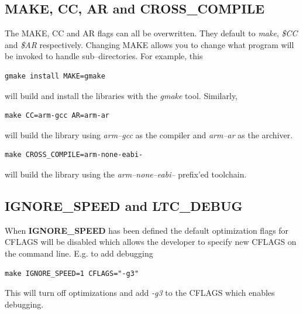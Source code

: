 \documentclass[synpaper]{book}
\begin{document}
\subsection{MAKE, CC, AR and CROSS\_COMPILE}
   
The MAKE, CC and AR flags can all be overwritten.  They default to \textit{make}, \textit{\$CC} and \textit{\$AR} respectively.
Changing MAKE allows you to change what program will be invoked to handle sub--directories. For example, this

\begin{verbatim}
gmake install MAKE=gmake
\end{verbatim}

\begin{flushleft} will build and install the libraries with the \textit{gmake} tool.  Similarly, \end{flushleft}

\begin{verbatim}
make CC=arm-gcc AR=arm-ar
\end{verbatim}

\begin{flushleft} will build the library using \textit{arm--gcc} as the compiler and \textit{arm--ar} as the archiver. \end{flushleft}

\begin{verbatim}
make CROSS_COMPILE=arm-none-eabi-
\end{verbatim}

\begin{flushleft} will build the library using the \textit{arm--none--eabi--} prefix'ed toolchain. \end{flushleft}

\subsection{IGNORE\_SPEED and LTC\_DEBUG}
 
When \textbf{IGNORE\_SPEED} has been defined the default optimization flags for CFLAGS will be disabled which allows the developer to specify new
CFLAGS on the command line.  E.g. to add debugging

\begin{verbatim}
make IGNORE_SPEED=1 CFLAGS="-g3"
\end{verbatim}

This will turn off optimizations and add \textit{-g3} to the CFLAGS which enables debugging.
\end{document}
